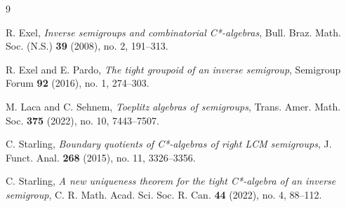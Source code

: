 \documentclass[12pt]{amsart}
\theoremstyle{definition}
\theoremstyle{remark}
\numberwithin{equation}{section}
\begin{document}
\begin{thebibliography}{9}

 R. Exel, \emph{Inverse semigroups and combinatorial C*-algebras}, Bull. Braz. Math. Soc. (N.S.) \textbf{39} (2008), no. 2, 191--313.

 R. Exel and E. Pardo, \emph{The tight groupoid of an inverse semigroup}, Semigroup Forum \textbf{92} (2016), no. 1, 274--303. 

 M. Laca and C. Sehnem, \emph{Toeplitz algebras of semigroups}, Trans. Amer. Math. Soc. \textbf{375} (2022), no. 10, 7443--7507.

 C. Starling, \emph{Boundary quotients of C*-algebras of right LCM semigroups}, J. Funct. Anal. \textbf{268} (2015), no. 11, 3326--3356.

 C. Starling, \emph{A new uniqueness theorem for the tight C*-algebra of an inverse semigroup}, C. R. Math. Acad. Sci. Soc. R. Can. \textbf{44} (2022), no. 4, 88--112.

\end{thebibliography}
\end{document}
